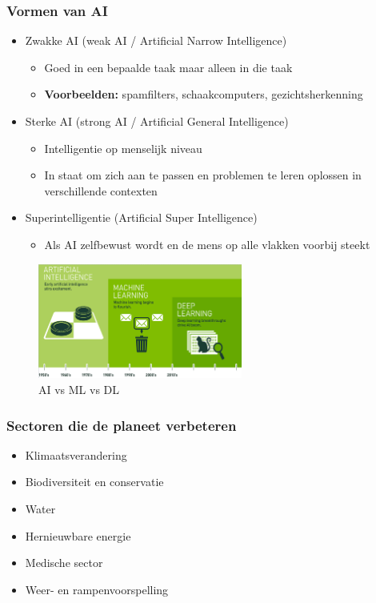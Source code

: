 \documentclass{article}
\begin{document}
\subsubsection{Vormen van AI}

\begin{itemize}
    \item Zwakke AI (weak AI / Artificial Narrow Intelligence)
    \begin{itemize}
        \item Goed in een bepaalde taak maar alleen in die taak
        \item \textbf{Voorbeelden: } spamfilters, schaakcomputers, gezichtsherkenning
    \end{itemize}
    \item Sterke AI (strong AI / Artificial General Intelligence)
    \begin{itemize}
        \item Intelligentie op menselijk niveau
        \item In staat om zich aan te passen en problemen te leren oplossen in verschillende contexten
    \end{itemize}
    \item Superintelligentie (Artificial Super Intelligence)
    \begin{itemize}
        \item Als AI zelfbewust wordt en de mens op alle vlakken voorbij steekt
    \end{itemize}
\end{itemize}

\begin{figure}[H]
    \centering
    \includegraphics[width=0.6\textwidth]{ai-history2.png}
    \caption{AI vs ML vs DL}
\end{figure}

\subsubsection{Sectoren die de planeet verbeteren}

\begin{itemize}
    \item Klimaatsverandering
    \item Biodiversiteit en conservatie
    \item Water
    \item Hernieuwbare energie
    \item Medische sector
    \item Weer- en rampenvoorspelling
\end{itemize}
\end{document}
